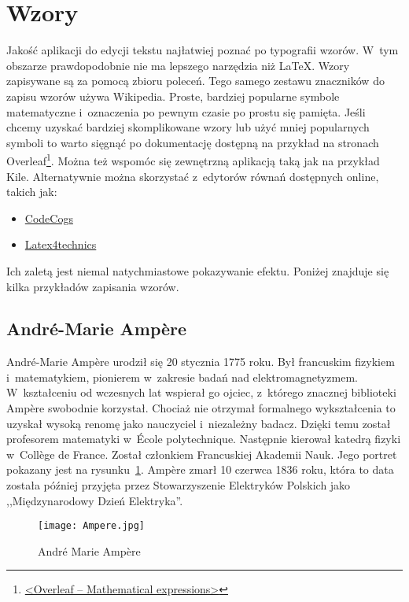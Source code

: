 \section{Wzory}
Jakość aplikacji do edycji tekstu najłatwiej poznać po typografii wzorów. W~tym obszarze prawdopodobnie nie ma lepszego narzędzia niż \LaTeX{}. Wzory zapisywane są za pomocą zbioru poleceń. Tego samego zestawu znaczników do zapisu wzorów używa Wikipedia. Proste, bardziej popularne symbole matematyczne i~oznaczenia po pewnym czasie po prostu się pamięta. Jeśli chcemy uzyskać bardziej skomplikowane wzory lub użyć mniej popularnych symboli to warto sięgnąć po dokumentację dostępną na przykład na stronach Overleaf\footnote{\href{https://www.overleaf.com/learn/latex/Mathematical_expressions}{<Overleaf -- Mathematical expressions>}}. Można też wspomóc się zewnętrzną aplikacją taką jak na przykład Kile. Alternatywnie można skorzystać z~edytorów równań dostępnych online, takich jak:
\begin{itemize}
    \item \href{https://latex.codecogs.com/eqneditor/editor.php}{CodeCogs}
    \item \href{https://www.latex4technics.com/}{Latex4technics}
\end{itemize}
Ich zaletą jest niemal natychmiastowe pokazywanie efektu. Poniżej znajduje się kilka przykładów zapisania wzorów.

\subsection{André-Marie Ampère}
André-Marie Ampère urodził się 20 stycznia 1775 roku. Był francuskim fizykiem i~matematykiem, pionierem w~zakresie badań nad elektromagnetyzmem. W~kształceniu od wczesnych lat wspierał go ojciec, z~którego znacznej biblioteki Ampère swobodnie korzystał. Chociaż nie otrzymał formalnego wykształcenia to uzyskał wysoką renomę jako nauczyciel i~niezależny badacz. Dzięki temu został profesorem matematyki w~École polytechnique. Następnie kierował katedrą fizyki w~Collège de France. Został członkiem Francuskiej Akademii Nauk. Jego portret pokazany jest na rysunku~\ref{rys:ampere}. Ampère zmarł 10 czerwca 1836 roku, która to data została później przyjęta przez Stowarzyszenie Elektryków Polskich jako ,,Międzynarodowy Dzień Elektryka''.

\begin{figure}[!hb]
    \centering \texttt{[image: Ampere.jpg]}
    \caption{André Marie Ampère}
    \label{rys:ampere}
\end{figure}

